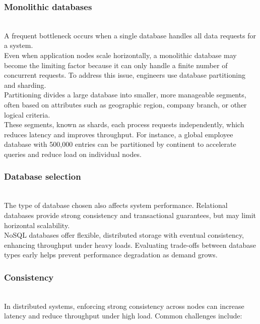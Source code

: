 \subsubsection{Monolithic databases}\label{AbXjGRmmsTRhOw-Fob-4E}
\\
A frequent bottleneck occurs when a single database handles all data requests for a system.
\\
Even when application nodes scale horizontally, a monolithic database may become the limiting factor because it can only handle a finite number of concurrent requests. To address this issue, engineers use database partitioning and sharding.
\\
Partitioning divides a large database into smaller, more manageable segments, often based on attributes such as geographic region, company branch, or other logical criteria.
\\
These segments, known as shards, each process requests independently, which reduces latency and improves throughput. For instance, a global employee database with 500,000 entries can be partitioned by continent to accelerate queries and reduce load on individual nodes.

\subsubsection{Database selection}\label{-046ipkrBwoyK0udlNKF-}
\\
The type of database chosen also affects system performance. Relational databases provide strong consistency and transactional guarantees, but may limit horizontal scalability.
\\
NoSQL databases offer flexible, distributed storage with eventual consistency, enhancing throughput under heavy loads. Evaluating trade-offs between database types early helps prevent performance degradation as demand grows.

\subsubsection{Consistency}\label{IiXgnw21aJE17Dib6Fggn}
\\
In distributed systems, enforcing strong consistency across nodes can increase latency and reduce throughput under high load. Common challenges include:

